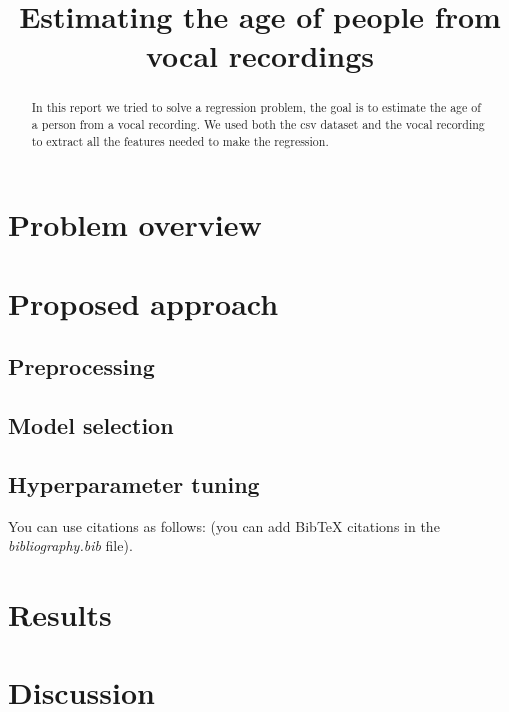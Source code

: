 \documentclass[conference]{IEEEtran}
\begin{document}
\title{Estimating the age of people from vocal recordings}

\author{
\and
{}
}

\maketitle

\begin{abstract}
In this report we tried to solve a regression problem, the goal is to estimate the age of a person from a vocal recording. We used both the csv dataset and the vocal recording to extract all the features needed to make the regression.
\end{abstract}

\section{Problem overview}


\section{Proposed approach}
\subsection{Preprocessing}

\subsection{Model selection}

\subsection{Hyperparameter tuning}


You can use citations as follows: \cite{goodfellow2016deep} (you can add BibTeX citations in the \textit{bibliography.bib} file).


\section{Results}


\section{Discussion}





\end{document}
